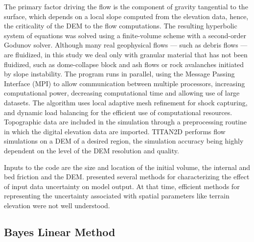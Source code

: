 \documentclass{article}
\begin{document}
The primary factor driving the flow is the component of gravity
tangential to the surface, which depends on a local slope computed
from the elevation data, hence, the criticality of the DEM to the flow
computations. The resulting hyperbolic system of equations was solved
using a finite-volume scheme with a second-order Godunov
solver. Although many real geophysical flows --- such as debris flows
--- are fluidized, in this study we deal only with granular material
that has not been fluidized, such as dome-collapse block and ash flows
or rock avalanches initiated by slope instability.  The program runs
in parallel, using the Message Passing Interface (MPI) to allow
communication between multiple processors, increasing computational
power, decreasing computational time and allowing use of large
datasets. The algorithm uses local adaptive mesh refinement for shock
capturing, and dynamic load balancing for the efficient use of
computational resources. Topographic data are included in the
simulation through a preprocessing routine in which the digital
elevation data are imported.  TITAN2D performs flow simulations on a
DEM of a desired region, the simulation accuracy being highly
dependent on the level of the DEM resolution and quality.

Inputs to the code are the size and location of the initial volume,
the internal and bed friction and the DEM. \citet{Keith} presented
several methods for characterizing the effect of input data
uncertainty on model output. At that time, efficient methods for
representing the uncertainty associated with spatial parameters like
terrain elevation were not well understood.

\subsection{Bayes Linear Method}
\end{document}
